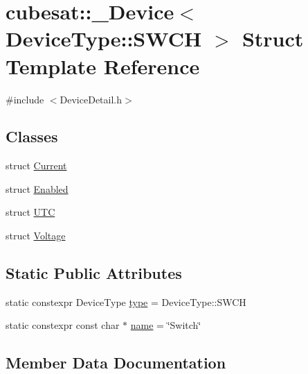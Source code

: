 \hypertarget{structcubesat_1_1__Device_3_01DeviceType_1_1SWCH_01_4}{}\section{cubesat\+:\+:\+\_\+\+Device$<$ Device\+Type\+:\+:S\+W\+CH $>$ Struct Template Reference}
\label{structcubesat_1_1__Device_3_01DeviceType_1_1SWCH_01_4}


{\ttfamily \#include $<$Device\+Detail.\+h$>$}

\subsection*{Classes}
\begin{DoxyCompactItemize}
\item 
struct \hyperlink{structcubesat_1_1__Device_3_01DeviceType_1_1SWCH_01_4_1_1Current}{Current}
\item 
struct \hyperlink{structcubesat_1_1__Device_3_01DeviceType_1_1SWCH_01_4_1_1Enabled}{Enabled}
\item 
struct \hyperlink{structcubesat_1_1__Device_3_01DeviceType_1_1SWCH_01_4_1_1UTC}{U\+TC}
\item 
struct \hyperlink{structcubesat_1_1__Device_3_01DeviceType_1_1SWCH_01_4_1_1Voltage}{Voltage}
\end{DoxyCompactItemize}
\subsection*{Static Public Attributes}
\begin{DoxyCompactItemize}
\item 
static constexpr Device\+Type \hyperlink{structcubesat_1_1__Device_3_01DeviceType_1_1SWCH_01_4_ad84fb11f2962d2967eb8f8e863d31ee9}{type} = Device\+Type\+::\+S\+W\+CH
\item 
static constexpr const char $\ast$ \hyperlink{structcubesat_1_1__Device_3_01DeviceType_1_1SWCH_01_4_a207ba3293bf66789f1a9f34af53b773e}{name} = \char`\"{}Switch\char`\"{}
\end{DoxyCompactItemize}


\subsection{Member Data Documentation}
\mbox{\label{structcubesat_1_1__Device_3_01DeviceType_1_1SWCH_01_4_a207ba3293bf66789f1a9f34af53b773e}} 
